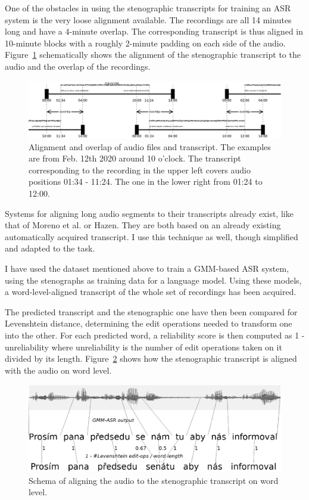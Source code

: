 \documentclass[conference]{IEEEtran}
\begin{document}
One of the obstacles in using the stenographic transcripts for training an ASR
system is the very loose alignment available. The recordings are all 14 minutes
long and have a 4-minute overlap. The corresponding transcript is thus aligned
in 10-minute blocks with a roughly 2-minute padding on each side of the audio.
Figure~\ref{fig:overlap} schematically shows the alignment of the stenographic
transcript to the audio and the overlap of the recordings.

\begin{figure}[tpb]
\centering
\includegraphics[width=0.9\hsize]{rc/overlap.eps}
\caption{Alignment and overlap of audio files and transcript. The examples are
from Feb. 12th 2020 around 10 o'clock. The transcript corresponding to the
recording in the upper left covers audio positions 01:34 - 11:24. The one in the
lower right from 01:24 to 12:00.}
\label{fig:overlap}
\end{figure}


Systems for aligning long audio segments to their transcripts already exist,
like that of Moreno et al.\cite{moreno1998recursive} or
Hazen\cite{hazen2006automatic}. They are both based on an already existing
automatically acquired transcript. I use this technique as well, though 
simplified and adapted to the task.

I have used the dataset mentioned above\cite{pspdata} to train a GMM-based ASR
system, using the stenographs as training data for a language model. Using these
models, a word-level-aligned transcript of the whole set of recordings has been
acquired.

The predicted transcript and the stenographic one have then been compared for
Levenshtein distance, determining the edit operations needed to transform one
into the other. For each predicted word, a reliability score is then
computed as 1 - unreliability where unreliability is the number of edit
operations taken on it divided by its length.
Figure~\ref{fig:align} shows how the stenographic transcript is aligned with the
audio on word level.

\begin{figure}[htpb]
\includegraphics[width=0.9\hsize]{rc/align.eps}
\caption{Schema of aligning the audio to the stenographic transcript on word
level.}
\label{fig:align}
\end{figure}
\end{document}
